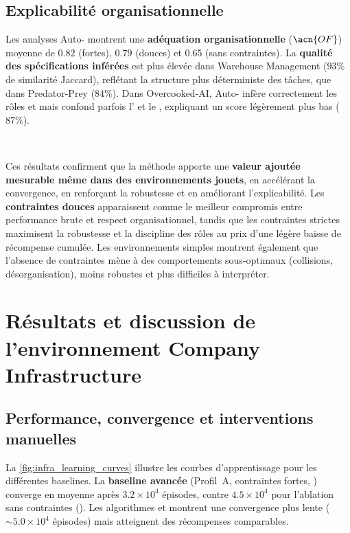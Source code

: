 \subsection*{Explicabilité organisationnelle}

Les analyses Auto- montrent une \textbf{adéquation organisationnelle} ($\acn{OF}$) moyenne de $0.82$ (fortes), $0.79$ (douces) et $0.65$ (sans contraintes).
La \textbf{qualité des spécifications inférées} est plus élevée dans Warehouse Management ($93\%$ de similarité Jaccard), reflétant la structure plus déterministe des tâches, que dans Predator-Prey ($84\%$).
Dans Overcooked-AI, Auto- infère correctement les rôles  et  mais confond parfois l' et le , expliquant un score légèrement plus bas ($87\%$).

\

Ces résultats confirment que la méthode  apporte une \textbf{valeur ajoutée mesurable même dans des environnements jouets}, en accélérant la convergence, en renforçant la robustesse et en améliorant l'explicabilité.
Les \textbf{contraintes douces} apparaissent comme le meilleur compromis entre performance brute et respect organisationnel, tandis que les contraintes strictes maximisent la robustesse et la discipline des rôles au prix d'une légère baisse de récompense cumulée.
Les environnements simples montrent également que l'absence de contraintes mène à des comportements sous-optimaux (collisions, désorganisation), moins robustes et plus difficiles à interpréter.


\section{Résultats et discussion de l'environnement Company Infrastructure}\label{sec:results_and_discussion_infra}

\subsection*{Performance, convergence et interventions manuelles}

La \autoref{fig:infra_learning_curves} illustre les courbes d'apprentissage pour les différentes baselines.
La \textbf{baseline avancée} (Profil~A, contraintes fortes, ) converge en moyenne après $3.2 \times 10^4$ épisodes, contre $4.5 \times 10^4$ pour l'ablation sans contraintes ().
Les algorithmes  et  montrent une convergence plus lente ($\sim 5.0 \times 10^4$ épisodes) mais atteignent des récompenses comparables.


